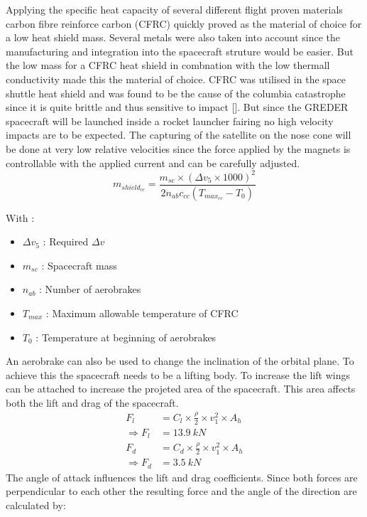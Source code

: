Applying the specific heat capacity of several different flight proven materials carbon fibre reinforce carbon (CFRC) quickly proved as the material of choice for a low heat shield mass. Several metals were also taken into account since the manufacturing and integration into the spacecraft struture would be easier. But the low mass for a CFRC heat shield in combnation with the low thermall conductivity made this the material of choice. CFRC was utilised in the space shuttle heat shield and was found to be the cause of the columbia catastrophe since it is quite brittle and thus sensitive to impact []. But since the GREDER spacecraft will be launched inside a rocket launcher fairing no high velocity impacts are to be expected. The capturing of the satellite on the nose cone will be done at very low relative velocities since the force applied by the magnets is controllable with the applied current and can be carefully adjusted.
\begin{equation}
	m_{shield_{cc}}= \frac{m_{sc} \times (\Delta v_5\times 1000)^2}{2n_{ab}c_{cc}(T_{max_{cc}}-T_0)}
\end{equation}

With :
\begin{itemize}
	\item $\Delta v_5$ : Required $\Delta v$
	\item $m_{sc}$ : Spacecraft mass
	\item $n_{ab}$ : Number of aerobrakes
	\item $T_{max}$ : Maximum allowable temperature of CFRC
	\item $T_0$ : Temperature at beginning of aerobrakes
\end{itemize}
An aerobrake can also be used to change the inclination of the orbital plane. To achieve this the spacecraft needs to be a lifting body. To increase the lift wings can be attached to increase the projeted area of the spacecraft. This area affects both the lift and drag of the spacecraft.
\begin{align}
	F_l &= C_l\times\frac \rho 2 \times v_1^2 \times A_h\\
	\Rightarrow F_l &= 13.9\ kN\\
	F_d &= C_d\times\frac \rho 2 \times v_1^2 \times A_h\\
	\Rightarrow F_d &= 3.5\ kN
\end{align}
The angle of attack influences the lift and drag coefficients. Since both forces are perpendicular to each other the resulting force and the angle of the direction are calculated by:

